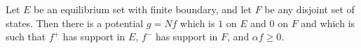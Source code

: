 Let $E$ be an equilibrium set with finite boundary, and let $F$ be any disjoint set of states. Then there is a potential $g = Nf$ which is $1$ on $E$ and $0$ on $F$ and which is such that $f^+$ has support in $E$, $f^-$ has support in $F$, and $\alpha f \geq 0$.
